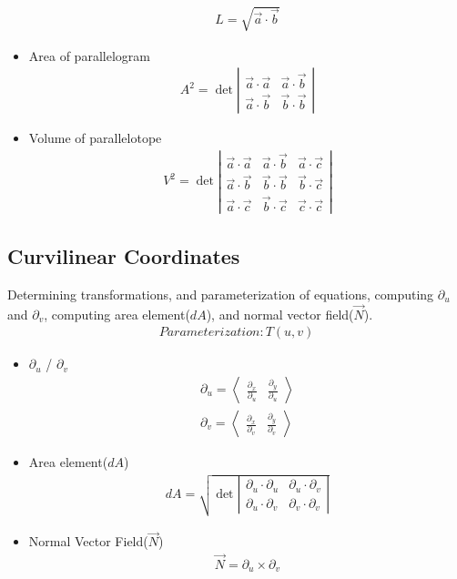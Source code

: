 \documentclass{article}
\begin{document}
\begin{itemize}
\begin{gather*}
L = \sqrt{\vec{a} \cdot \vec{b}}
\end{gather*}
\item Area of parallelogram
\begin{gather*}
A^2 = \det \left|\begin{array}{cc}
\vec{a} \cdot \vec{a} & \vec{a} \cdot \vec{b} \\
\vec{a} \cdot \vec{b} & \vec{b} \cdot \vec{b} 
\end{array}\right|
\end{gather*}
\item Volume of parallelotope
\begin{gather*}
V^2 = \det \left|\begin{array}{ccc}
\vec{a} \cdot \vec{a} & \vec{a} \cdot \vec{b} & \vec{a} \cdot \vec{c} \\
\vec{a} \cdot \vec{b} & \vec{b} \cdot \vec{b} & \vec{b} \cdot \vec{c} \\ 
\vec{a} \cdot \vec{c} & \vec{b} \cdot \vec{c} & \vec{c} \cdot \vec{c}
\end{array}\right|
\end{gather*}
\end{itemize}
\subsection{Curvilinear Coordinates}
Determining transformations, and parameterization of equations, computing $\partial_u$ and $\partial_v$, computing area element($dA$), and normal vector field($\vec{N}$).
\begin{gather*}
Parameterization:T(u,v)
\end{gather*}
\begin{itemize}
\item $\partial_u$ / $\partial_v$
\begin{gather*}
\partial_u = \left<\begin{array}{cc}
\frac{\partial_x}{\partial_u} & \frac{\partial_y}{\partial_u}
\end{array}\right>\\
\partial_v = \left<\begin{array}{cc}
\frac{\partial_x}{\partial_v} & \frac{\partial_y}{\partial_v}
\end{array}\right>
\end{gather*}
\item Area element($dA$)
\begin{gather*}
dA = \sqrt{\det \left|\begin{array}{cc}
\partial_u \cdot \partial_u & \partial_u \cdot \partial_v \\
\partial_u \cdot \partial_v & \partial_v \cdot \partial_v 
\end{array}\right|}
\end{gather*}
\item Normal Vector Field($\vec{N}$)
\begin{gather*}
\vec{N} = \partial_u \times \partial_v
\end{gather*}
\end{itemize}
\end{document}
